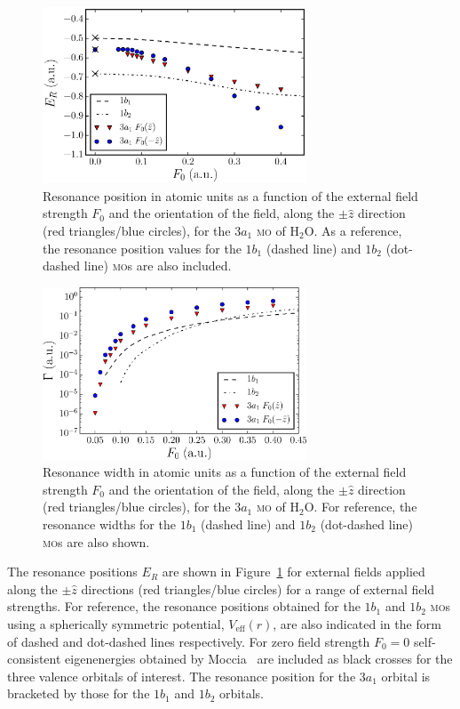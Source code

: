 \begin{figure}
  \centering
  \includegraphics[width=0.7\textwidth]{figures/ch_H2O/3a1/resPosvsForbitals_compf32snew.eps}
  \caption{Resonance position in atomic units as a function of the
    external field strength $F_{0}$ and the orientation of the field,
    along the $\pm\hat{z}$ direction (red triangles/blue circles), for
    the $3a_{1}$ \textsc{mo} of H$_{2}$O. As a reference, the resonance
    position values for the $1b_{1}$ (dashed line) and $1b_{2}$
    (dot-dashed line) \textsc{mo}s are also included.}
  \label{fig:3a1_position}
\end{figure}

\begin{figure}
  \centering
  \includegraphics[width=0.7\textwidth]{figures/ch_H2O/3a1/resWidthvsForbitals_compf32snew.eps}
  \caption{Resonance width in atomic units as a function of the
    external field strength $F_{0}$ and the orientation of the field,
    along the $\pm\hat{z}$ direction (red triangles/blue circles), for
    the $3a_{1}$ \textsc{mo} of H$_{2}$O. For reference, the resonance
    widths for the $1b_{1}$ (dashed line) and $1b_{2}$ (dot-dashed
    line) \textsc{mo}s are also shown.}
  \label{fig:3a1_width}
\end{figure}

The resonance positions $E_{R}$ are shown in
Figure~\ref{fig:3a1_position} for external fields applied along the
$\pm\hat{z}$ directions (red triangles/blue circles) for a range of
external field strengths. For reference, the resonance positions
obtained for the $1b_{1}$ and $1b_{2}$ \textsc{mo}s using a
spherically symmetric potential, $V_{\mathrm{eff}}(r)$, are also
indicated in the form of dashed and dot-dashed lines respectively. For
zero field strength $F_{0} = 0$ self-consistent eigenenergies obtained
by Moccia~\cite{Moccia_1964} are included as black crosses for the
three valence orbitals of interest. The resonance position for the
$3a_{1}$ orbital is bracketed by those for the $1b_{1}$ and $1b_{2}$
orbitals.


